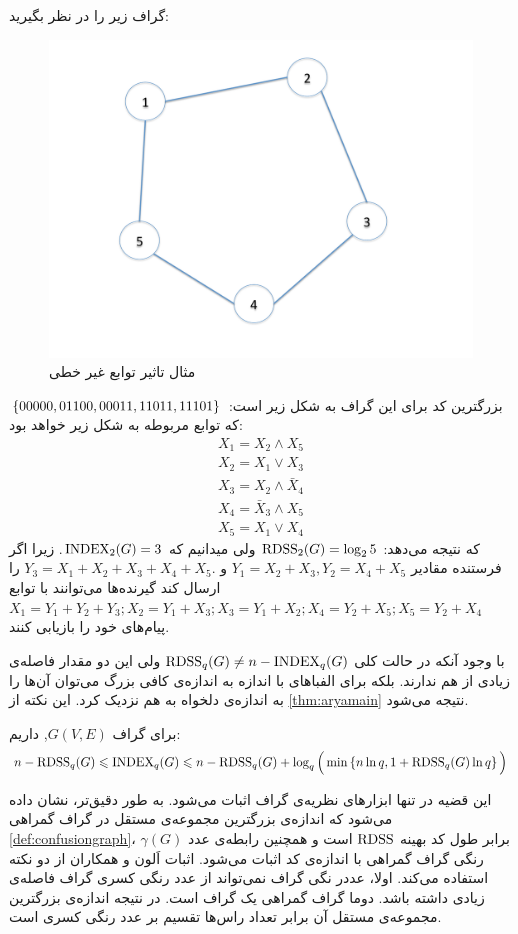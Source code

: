  \begin{example}
 	گراف زیر را در نظر بگیرید:
\begin{figure}[H]
	\centering
	\includegraphics[width=0.4\linewidth]{figs/chapter6/storage-graph-pent}
	\caption[مثال تاثیر توابع غیر خطی]{
		مثال تاثیر توابع غیر خطی
	\cite{arya}
	}
	\label{fig:storage-graph-pent}
\end{figure}
بزرگترین کد برای این گراف به شکل زیر است:
$\left\{ 00000,01100,00011,11011,11101 \right\}$
که توابع مربوطه به شکل زیر خواهد بود:
\begin{align*}
	X_1 = X_2 \wedge X_5 \\
	X_2 = X_1 \vee X_3 \\
	X_3 = X_2 \wedge \bar{X}_4 \\
	X_4 = \bar{X}_3 \wedge X_5 \\
	X_5 = X_1\vee X_4
\end{align*}
که نتیجه می‌دهد:
$\mathrm{RDSS}_2(G) = \log_2 5$
ولی میدانیم که
$\mathrm{INDEX}_2(G)=3$.
زیرا اگر فرستنده مقادیر
 $Y_1= X_2+X_3, Y_2= X_4+X_5$ 
 و
  $Y_3= X_1+X_2+X_3+X_4+X_5.$
  را ارسال کند گیرنده‌ها می‌توانند با توابع
  $X_1 = Y_1 + Y_2+Y_3; X_2 = Y_1+X_3; X_3 = Y_1+X_2; X_4 = Y_2+X_5; X_5 = Y_2+X_4$
  پیام‌های خود را بازیابی کنند.
 \end{example}
 
 با وجود آنکه در حالت کلی 
 $\mathrm{RDSS}_q(G) \ne n - \mathrm{INDEX}_q(G)$
 ولی این دو مقدار فاصله‌ی زیادی از هم ندارند. بلکه برای الفباهای با اندازه به اندازه‌ی کافی بزرگ می‌توان آن‌ها را به اندازه‌ی دلخواه به هم نزدیک کرد. این نکته از 
 \autoref{thm:aryamain}
 نتیجه می‌شود.
 \begin{theorem}\label{thm:aryamain}
 	برای گراف
 	 $G(V,E)$,
 	 داریم:
 	\begin{align}
 		n - \mathrm{RDSS}_q(G) \leqslant \mathrm{INDEX}_q(G) \leqslant n -\mathrm{RDSS}_q(G) + \log_q\Big(\min\left\{ n\ln q, 1+ \mathrm{RDSS}_q(G)\ln q  \right\}\Big)
 	\end{align}
 \end{theorem}
 
 این قضیه در
 \cite{4691014}
 تنها ابزارهای نظریه‌ی گراف اثبات می‌شود. به طور دقیق‌تر، نشان داده می‌شود که اندازه‌ی بزرگترین مجموعه‌ی مستقل در گراف گمراهی
 \autoref{def:confusiongraph}،
 $\gamma(G)$
 برابر طول کد بهینه
$\mathrm{RDSS}$
 است و همچنین رابطه‌ی عدد رنگی گراف گمراهی با اندازه‌ی کد
 \icod
 اثبات می‌شود. اثبات اَلون و همکاران از دو نکته استفاده می‌کند. اولا، عددر نگی گراف نمی‌تواند از عدد رنگی کسری گراف فاصله‌ی زیادی داشته باشد. دوما گراف گمراهی یک گراف
 است. در نتیجه اندازه‌ی بزرگترین مجموعه‌ی مستقل آن برابر تعداد راس‌ها تقسیم بر عدد رنگی کسری است.
 
